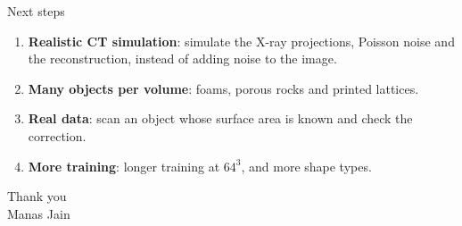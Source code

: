 \documentclass[aspectratio=169,11pt]{beamer}
\begin{document}
\begin{frame}{Next steps}
  \begin{enumerate}
    \item \textbf{Realistic CT simulation}: simulate the X-ray projections, Poisson noise and the
          reconstruction, instead of adding noise to the image.
    \item \textbf{Many objects per volume}: foams, porous rocks and printed lattices.
    \item \textbf{Real data}: scan an object whose surface area is known and check the correction.
    \item \textbf{More training}: longer training at $64^3$, and more shape types.
  \end{enumerate}
\end{frame}

\begin{frame}
  \centering
  \vspace{2em}
  {\Huge Thank you}\\[1.5em]
  Manas Jain \quad\textbar{}
\end{frame}
\end{document}
